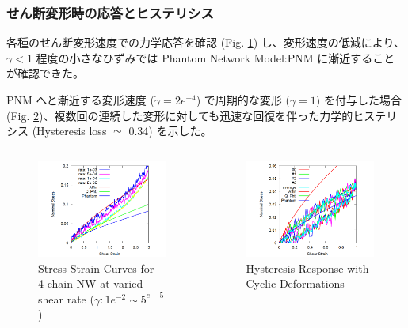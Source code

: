 \documentclass[12pt, dvipdfmx]{beamer}
\begin{document}
\begin{frame}
	\frametitle{せん断変形時の応答とヒステリシス}
	各種のせん断変形速度での力学応答を確認 (Fig. \ref{deform}) し、変形速度の低減により、$\gamma<1$ 程度の小さなひずみでは Phantom Network Model:PNM に漸近することが確認できた。

	PNM へと漸近する変形速度 ($\dot{\gamma} = 2e^{-4}$) で周期的な変形 ($\gamma = 1$) を付与した場合 (Fig. \ref{cyclic})、複数回の連続した変形に対しても迅速な回復を伴った力学的ヒステリシス (Hysteresis loss $\simeq$ 0.34) を示した。
	\begin{columns}[totalwidth=\linewidth]
		\begin{figure}[htb]
			\centering
				\includegraphics[width=.8\textwidth]{Shear_Random_4chain_N20.png}
				\caption{Stress-Strain Curves for 4-chain NW at varied shear rate ($\dot{\gamma}: 1e^{-2} \sim 5^{e-5}$)}
				\label{deform}
		\end{figure}
		\begin{figure}[htb]
			\centering
				\includegraphics[width=.8\textwidth]{CyclicDeform_4chain_rate_2e-4.png}
				\caption{Hysteresis Response with Cyclic Deformations}
				\label{cyclic}
		\end{figure}
		\end{columns}
\end{frame}
\end{document}
